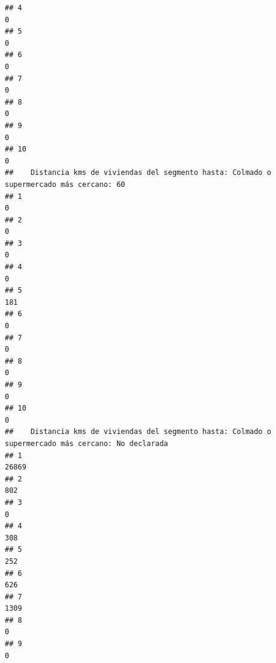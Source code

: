 \documentclass[11pt,]{article}
\begin{document}
\begin{verbatim}
## 4                                                                                      0
## 5                                                                                      0
## 6                                                                                      0
## 7                                                                                      0
## 8                                                                                      0
## 9                                                                                      0
## 10                                                                                     0
##    Distancia kms de viviendas del segmento hasta: Colmado o supermercado más cercano: 60
## 1                                                                                      0
## 2                                                                                      0
## 3                                                                                      0
## 4                                                                                      0
## 5                                                                                    181
## 6                                                                                      0
## 7                                                                                      0
## 8                                                                                      0
## 9                                                                                      0
## 10                                                                                     0
##    Distancia kms de viviendas del segmento hasta: Colmado o supermercado más cercano: No declarada
## 1                                                                                            26869
## 2                                                                                              802
## 3                                                                                                0
## 4                                                                                              308
## 5                                                                                              252
## 6                                                                                              626
## 7                                                                                             1309
## 8                                                                                                0
## 9                                                                                                0

\end{verbatim}
\end{document}
